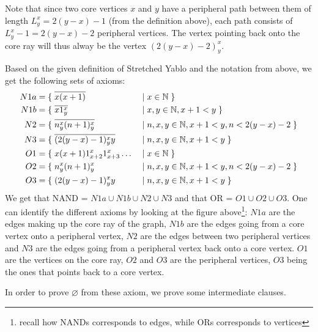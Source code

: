 Note that since two core vertices $x$ and $y$ have a peripheral path between them of length $L^x_y = 2(y-x) - 1$ (from the definition above), each path consists of $L^x_y - 1 = 2(y-x) - 2$ peripheral vertices.
The vertex pointing back onto the core ray will thus alway be the vertex $(2(y-x)-2)^x_y$.

Based on the given definition of Stretched Yablo and the notation from above, we get the following sets of axioms:
\begin{align}
  N1a &= \{\; \overline{x(x+1)} \;&&|\; x \in \mathbb{N} \; \} \\
	N1b &= \{\; \overline{x1^x_y} \;&&|\; x,y \in \mathbb{N}, x+1 < y \; \} \\
	N2 &= \{\; \overline{n^x_y(n+1)^x_y} \;&&|\; n,x,y \in \mathbb{N}, x+1 < y, n < 2(y-x) - 2 \; \} \\
	N3 &= \{\; \overline{(2(y-x)-1)^x_yy} \;&&|\; n,x,y \in \mathbb{N}, x+1 < y \; \} \\
	O1 &= \{\; x(x+1)1^x_{x+2}1^x_{x+3}\dots \;&&|\; x \in \mathbb{N} \; \} \\
  O2 &= \{\; n^x_y(n+1)^x_y \;&&|\; n,x,y \in \mathbb{N}, x+1 < y, n < 2(y-x) - 2 \; \} \\
	O3 &= \{\; (2(y-x)-1)^x_yy \;&&|\; n,x,y \in \mathbb{N}, x+1 < y \; \}
\end{align}
We get that NAND = $N1a \cup N1b \cup N2 \cup N3$ and that OR = $O1 \cup O2 \cup O3$.
One can identify the different axioms by looking at the figure above\footnote{recall how NANDs corresponds to edges, while ORs corresponds to vertices}:
$N1a$ are the edges making up the core ray of the graph, $N1b$ are the edges going from a core vertex onto a peripheral vertex, $N2$ are the edges between two peripheral vertices and $N3$ are the edges going from a peripheral vertex back onto a core vertex.
$O1$ are the vertices on the core ray, $O2$ and $O3$ are the peripheral vertices, $O3$ being the ones that points back to a core vertex.

In order to prove $\varnothing$ from these axiom, we prove some intermediate clauses.

